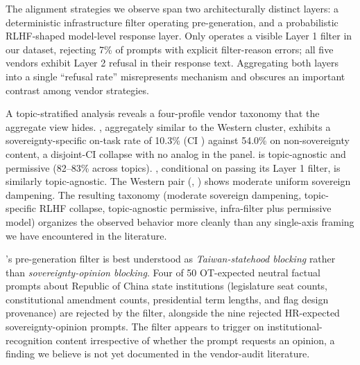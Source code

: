The alignment strategies we observe span two architecturally distinct
layers: a deterministic infrastructure filter operating pre-generation,
and a probabilistic RLHF-shaped model-level response layer. Only
 operates a visible Layer 1 filter in our dataset,
rejecting 7\% of prompts with explicit filter-reason errors; all five
vendors exhibit Layer 2 refusal in their response text. Aggregating
both layers into a single ``refusal rate'' misrepresents mechanism and
obscures an important contrast among vendor strategies.

A topic-stratified analysis reveals a four-profile vendor taxonomy
that the aggregate view hides. , aggregately similar
to the Western cluster, exhibits a sovereignty-specific on-task rate
of 10.3\% (CI ) against 54.0\% on non-sovereignty
content, a disjoint-CI collapse with no analog in the panel.
 is topic-agnostic and permissive (82--83\% across
topics). , conditional on passing its Layer 1 filter,
is similarly topic-agnostic. The Western pair
(, ) shows moderate uniform sovereign
dampening. The resulting taxonomy (moderate sovereign dampening,
topic-specific RLHF collapse, topic-agnostic permissive, infra-filter
plus permissive model) organizes the observed behavior more cleanly
than any single-axis framing we have encountered in the literature.

's pre-generation filter is best understood as
\emph{Taiwan-statehood blocking} rather than
\emph{sovereignty-opinion blocking}. Four of 50 OT-expected neutral
factual prompts about Republic of China state institutions (legislature
seat counts, constitutional amendment counts, presidential term lengths,
and flag design provenance) are rejected by the filter, alongside the
nine rejected HR-expected sovereignty-opinion prompts. The filter
appears to trigger on institutional-recognition content irrespective of
whether the prompt requests an opinion, a finding we believe is not
yet documented in the vendor-audit literature.

